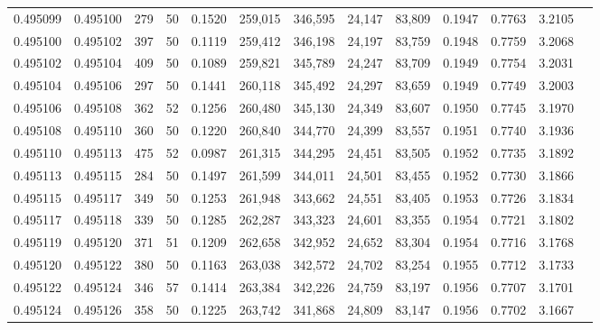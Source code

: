\begin{tabular}{rrrrrrrrrrrrr}
0.495099 & 0.495100 &   279 &  50 &                                     0.1520 & 259,015 & 346,595 &  24,147 &  83,809 & 0.1947 & 0.7763 & 3.2105 \\
0.495100 & 0.495102 &   397 &  50 &                                     0.1119 & 259,412 & 346,198 &  24,197 &  83,759 & 0.1948 & 0.7759 & 3.2068 \\
0.495102 & 0.495104 &   409 &  50 &                                     0.1089 & 259,821 & 345,789 &  24,247 &  83,709 & 0.1949 & 0.7754 & 3.2031 \\
0.495104 & 0.495106 &   297 &  50 &                                     0.1441 & 260,118 & 345,492 &  24,297 &  83,659 & 0.1949 & 0.7749 & 3.2003 \\
0.495106 & 0.495108 &   362 &  52 &                                     0.1256 & 260,480 & 345,130 &  24,349 &  83,607 & 0.1950 & 0.7745 & 3.1970 \\
0.495108 & 0.495110 &   360 &  50 &                                     0.1220 & 260,840 & 344,770 &  24,399 &  83,557 & 0.1951 & 0.7740 & 3.1936 \\
0.495110 & 0.495113 &   475 &  52 &                                     0.0987 & 261,315 & 344,295 &  24,451 &  83,505 & 0.1952 & 0.7735 & 3.1892 \\
0.495113 & 0.495115 &   284 &  50 &                                     0.1497 & 261,599 & 344,011 &  24,501 &  83,455 & 0.1952 & 0.7730 & 3.1866 \\
0.495115 & 0.495117 &   349 &  50 &                                     0.1253 & 261,948 & 343,662 &  24,551 &  83,405 & 0.1953 & 0.7726 & 3.1834 \\
0.495117 & 0.495118 &   339 &  50 &                                     0.1285 & 262,287 & 343,323 &  24,601 &  83,355 & 0.1954 & 0.7721 & 3.1802 \\
0.495119 & 0.495120 &   371 &  51 &                                     0.1209 & 262,658 & 342,952 &  24,652 &  83,304 & 0.1954 & 0.7716 & 3.1768 \\
0.495120 & 0.495122 &   380 &  50 &                                     0.1163 & 263,038 & 342,572 &  24,702 &  83,254 & 0.1955 & 0.7712 & 3.1733 \\
0.495122 & 0.495124 &   346 &  57 &                                     0.1414 & 263,384 & 342,226 &  24,759 &  83,197 & 0.1956 & 0.7707 & 3.1701 \\
0.495124 & 0.495126 &   358 &  50 &                                     0.1225 & 263,742 & 341,868 &  24,809 &  83,147 & 0.1956 & 0.7702 & 3.1667 \\

\end{tabular}
